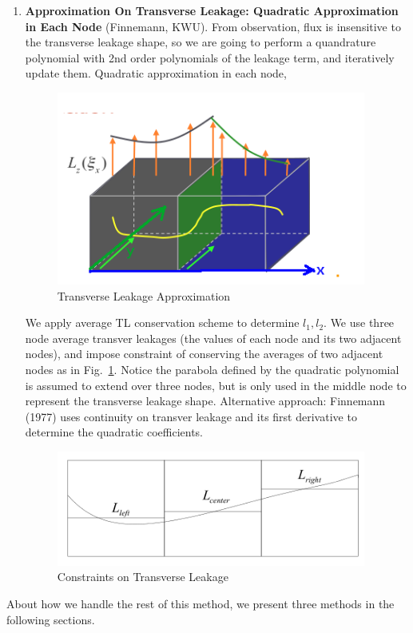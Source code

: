 \documentclass{school-22.211-notes}
\begin{document}
\begin{enumerate}
\item \textbf{Approximation On Transverse Leakage: Quadratic Approximation in Each Node} (Finnemann, KWU). 
 From observation, flux is insensitive to the transverse leakage shape, so we are going to perform a quandrature polynomial with 2nd order polynomials of the leakage term, and iteratively update them. Quadratic approximation in each node, 
  \begin{figure}[h]
    \centering
    \includegraphics[width=4in]{images/methd/tl-approx.png}
    \caption{Transverse Leakage Approximation} 
  \end{figure}
  We apply average TL conservation scheme to determine $l_1, l_2$. We use three node average transver leakages (the values of each node and its two adjacent nodes), and impose constraint of conserving the averages of two adjacent nodes as in Fig.~\ref{tl-constrains}. Notice the parabola defined by the quadratic polynomial is assumed to extend over three nodes, but is only used in the middle node to represent the transverse leakage shape. Alternative approach: Finnemann (1977) uses continuity on transver leakage and its first derivative to determine the quadratic coefficients. 
    \begin{figure}[h]
    \centering
    \includegraphics[width=4in]{images/methd/tl-constrains.png}
    \caption{Constraints on Transverse Leakage} \label{tl-constrains}
  \end{figure}
\end{enumerate}
About how we handle the rest of this method, we present three methods in the following sections. 
\end{document}
